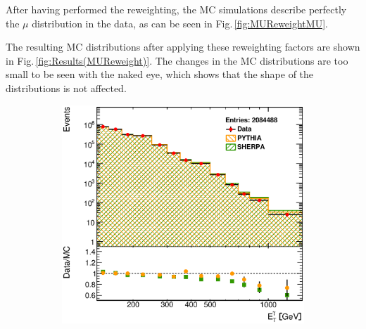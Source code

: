 \documentclass[12pt, twoside]{article}
\numberwithin{equation}{section}
\numberwithin{figure}{section}
\newenvironment{changemargin}[2]{%
\begin{list}{}{%
\setlength{\topsep}{0pt}%
\setlength{\leftmargin}{#1}%
\setlength{\rightmargin}{#2}%
\setlength{\listparindent}{\parindent}%
\setlength{\itemindent}{\parindent}%
\setlength{\parsep}{\parskip}%
}%
\item[]}{\end{list}}
\begin{document}
After having performed the reweighting, the MC simulations describe perfectly the $\mu$ distribution in the data, as can be seen in Fig.\,\ref{fig:MUReweightMU}.

The resulting MC distributions after applying these reweighting factors are shown in Fig.\,\ref{fig:Results(MUReweight)}. The changes in the MC distributions are too small to be seen with the naked eye, which shows that the shape of the distributions is not affected.
\begin{figure}
    \centering
    \checkoddpage
    \ifoddpage
        \begin{changemargin}{-1.0cm}{-0.75cm}
    \else
        \begin{changemargin}{-0.75cm}{-1.0cm}
    \fi
        \begin{subfigure}[b]{0.37\textwidth}
            \includegraphics[width=\textwidth]{./images/Results(MUReweight)/DEF-101.eps}
            \subcaption{}
            \label{fig:MUReweightEtPhoton}
        \end{subfigure}
        \begin{subfigure}[b]{0.37\textwidth}

\end{subfigure}
\end{changemargin}
\end{changemargin}
\end{figure}
\end{document}

